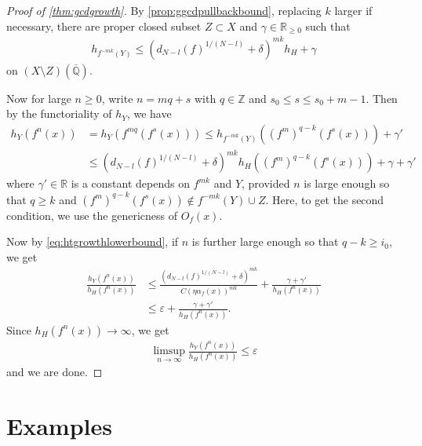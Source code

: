 \documentclass[12pt]{amsart}
\theoremstyle{plain}
\theoremstyle{definition}
\numberwithin{equation}{section}
\def\R{{\mathbb R}}
\def\Z{{\mathbb Z}}
\def\QQ{\overline{\mathbb Q}}
\newcommand{\g}{\gamma}
\renewcommand{\d}{\delta}
\newcommand{\e}{\varepsilon}
\begin{document}
\begin{proof}[Proof of \cref{thm:gcdgrowth}]
By \cref{prop:ggcdpullbackbound}, replacing $k$ larger if necessary,
there are proper closed subset $Z \subset X$ and $\g \in \R_{\geq 0}$ such that
\begin{align}
h_{f^{-mk}(Y)} \leq (d_{N-l}(f)^{1/(N-l)} + \d )^{mk}h_{H} + \g
\end{align}
on $(X \setminus Z)(\QQ)$.

Now for large $n \geq 0$, write $n = mq + s$ with $q \in \Z$ and $s_{0} \leq s \leq s_{0} + m -1$.
Then by the functoriality of $h_{Y}$, we have
\begin{align}
h_{Y}(f^{n}(x)) &= h_{Y}(f^{mq}(f^{s}(x))) \leq h_{f^{-mk}(Y)} ((f^{m})^{q-k}(f^{s}(x))) + \g'\\
& \leq 
(d_{N-l}(f)^{1/(N-l)} + \d )^{mk}h_{H}((f^{m})^{q-k}(f^{s}(x))) + \g + \g'
\end{align}
where $\g' \in \R$ is a constant depends on $f^{mk}$ and $Y$,
provided $n$ is large enough so that
$q \geq k$ and $(f^{m})^{q-k}(f^{s}(x)) \not\in f^{-mk}(Y) \cup Z$.
Here, to get the second condition, we use the genericness of $O_{f}(x)$.

Now by \cref{eq:htgrowthlowerbound}, if $n$ is further large enough so that
$q-k \geq i_{0}$, we get
\begin{align}
\frac{h_{Y}(f^{n}(x))}{h_{H}(f^{n}(x))} 
&\leq 
\frac{ (d_{N-l}(f)^{1/(N-l)} + \d )^{mk} }{C (\eta \alpha_{f}(x))^{mk} }   +  \frac{\g + \g'}{h_{H}(f^{n}(x))}\\
&\leq 
\e +  \frac{\g + \g'}{h_{H}(f^{n}(x))}.
\end{align}
Since $h_{H}(f^{n}(x)) \to \infty$, we get
\begin{align}
\limsup_{n \to \infty} \frac{h_{Y}(f^{n}(x))}{h_{H}(f^{n}(x))}  \leq \e
\end{align}
and we are done.
\end{proof}

\section{Examples}
\end{document}
